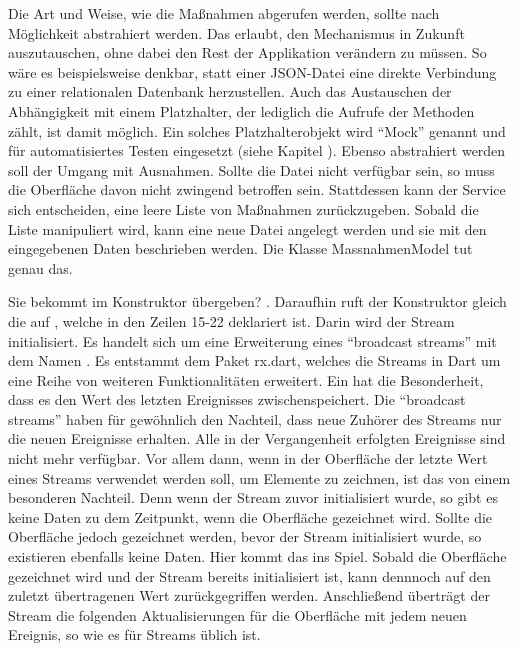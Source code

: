 Die Art und Weise, wie die Maßnahmen abgerufen werden, sollte nach Möglichkeit abstrahiert werden.
Das erlaubt, den Mechanismus in Zukunft auszutauschen, ohne dabei den Rest der Applikation verändern zu müssen.
So wäre es beispielsweise denkbar, statt einer JSON-Datei eine direkte Verbindung zu einer relationalen Datenbank herzustellen.
Auch das Austauschen der Abhängigkeit mit einem Platzhalter, der lediglich die Aufrufe der Methoden zählt, ist damit möglich.
Ein solches Platzhalterobjekt wird \enquote{Mock} genannt und für automatisiertes Testen eingesetzt (siehe Kapitel  ).
Ebenso abstrahiert werden soll der Umgang mit Ausnahmen.
Sollte die Datei nicht verfügbar sein, so muss die Oberfläche davon nicht zwingend betroffen sein.
Stattdessen kann der Service sich entscheiden, eine leere Liste von Maßnahmen zurückzugeben.
Sobald die Liste manipuliert wird, kann eine neue Datei angelegt werden und sie mit den eingegebenen Daten beschrieben werden.
Die Klasse MassnahmenModel \Lst{\ref{lst:Schritt1KlasseMassnahmenModel}} tut genau das.






Sie bekommt  im Konstruktor übergeben? .
Daraufhin ruft der Konstruktor gleich die  auf , welche in den Zeilen 15-22 deklariert ist.
Darin wird der Stream   initialisiert.
Es handelt sich um eine Erweiterung eines \enquote{broadcast streams} mit dem Namen  .
Es entstammt dem Paket rx.dart, welches die Streams in Dart um eine Reihe von weiteren Funktionalitäten erweitert. Ein  hat die Besonderheit, dass es den Wert des letzten Ereignisses zwischenspeichert. Die \enquote{broadcast streams} haben für gewöhnlich den Nachteil, dass neue Zuhörer des Streams nur die neuen Ereignisse erhalten. Alle in der Vergangenheit erfolgten Ereignisse sind nicht mehr verfügbar. Vor allem dann, wenn in der Oberfläche der letzte Wert eines Streams verwendet werden soll, um Elemente zu zeichnen, ist das von einem besonderen Nachteil. Denn wenn der Stream zuvor initialisiert wurde, so gibt es keine Daten zu dem Zeitpunkt, wenn die Oberfläche gezeichnet wird. Sollte die Oberfläche jedoch gezeichnet werden, bevor der Stream initialisiert wurde, so  existieren ebenfalls keine Daten. Hier kommt das  ins Spiel. Sobald die Oberfläche gezeichnet wird und der Stream bereits initialisiert ist, kann dennnoch auf den zuletzt übertragenen Wert zurückgegriffen werden. Anschließend überträgt der Stream die folgenden Aktualisierungen für die Oberfläche mit jedem neuen Ereignis, so wie es für Streams üblich ist.

